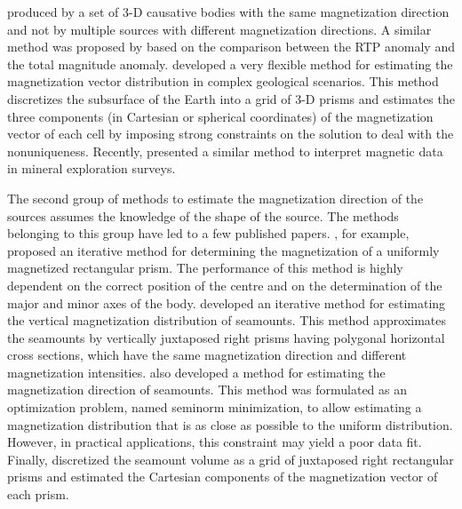 \documentclass[journal abbreviation, npg]{copernicus}
\begin{document}
produced by a set of 3-D causative bodies with the same magnetization
direction and not by multiple sources with different magnetization
directions. A similar method was proposed by \citet{gerovska-etal2009} based
on the comparison between the RTP anomaly and the total magnitude anomaly.
\citet{lelievre-oldenburg2009} developed a very flexible method for
estimating the magnetization vector distribution in complex geological
scenarios. This method discretizes the subsurface of the Earth into a grid of
3-D prisms and estimates the three components (in Cartesian or spherical
coordinates) of the magnetization vector of each cell by imposing strong
constraints on the solution to deal with the nonuniqueness. Recently,
\citet{ellis-etal2012} presented a similar method to interpret magnetic data
in mineral exploration surveys.

The second group of methods to estimate the magnetization direction of
the sources assumes the knowledge of the shape of the source. The
methods belonging to this group have led to a few published
papers. \citet{bhattacharyya1966}, for example, proposed an iterative
method for determining the magnetization of a uniformly magnetized
rectangular prism. The performance of this method is highly dependent
on the correct position of the centre and on the determination of the
major and minor axes of the body. \citet{emilia-massey1974} developed
an iterative method for estimating the vertical magnetization
distribution of seamounts. This method approximates the seamounts by
vertically juxtaposed right prisms having polygonal horizontal cross
sections, which have the same magnetization direction and different
magnetization intensities. \citet{parker-etal1987} also developed
a method for estimating the magnetization direction of seamounts. This
method was formulated as an optimization problem, named seminorm
minimization, to allow estimating a magnetization distribution that is
as close as possible to the uniform distribution. However, in
practical applications, this constraint may yield a poor data
fit. Finally, \citet{kubota-uchiyama2005} discretized the seamount
volume as a grid of juxtaposed right rectangular prisms and estimated
the Cartesian components of the magnetization vector of each prism.
\end{document}
